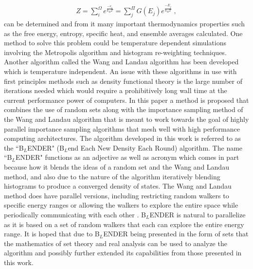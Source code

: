 \documentclass[aps,prl,reprint,superscriptaddress,showkeys]{revtex4-1}
\begin{document}
\begin{equation}
\begin{split}
Z = \sum_{i}^{\Omega}e^{\frac{-e_i}{k_B T} }= \sum_{j}^{\Pi}G(E_j)e^{\frac{-E_j}{k_BT}} \;,
\end{split}
\end{equation}
can be  determined and from it many important thermodynamics properties such as the free energy, entropy, specific heat, and ensemble averages calculated. One method to solve this problem could be temperature dependent simulations involving the  Metropolis algorithm and histogram re-weighting techniques\cite{metropolis_equation_1953, landau_MC_simulations}.  Another algorithm called the  Wang and Landau algorithm\cite{WL_phys_rev_lett} has been developed which is temperature independent. An issue with these algorithms in use with first principles methods such as density functional theory is the large number of iterations needed which would require a prohibitively long wall time at the current performance power of computers.  In this paper a method is proposed that combines the use of random sets along with the importance sampling method of the Wang and Landau algorithm that is meant to work towards the goal of highly parallel importance sampling algorithms that mesh well with high performance computing architectures. The algorithm developed in this work is referred to as the ``B$_{L}$ENDER" (B$_{L}$end Each New Density Each Round) algorithm. The name ``B$_{L}$ENDER" functions as an  adjective as well as acronym which comes in part because how it blends the ideas of a random set and the Wang and Landau method, and also due to the nature of the algorithm iteratively blending histograms to produce a converged density of states.  The Wang and Landau method does have parallel versions, including  restricting random walkers to specific energy ranges or allowing the walkers to explore the entire space while periodically communicating with each other \cite{MP_Wang_Landau,P_imp_Wang_Landau, Hframe_Wang_Landau}.  B$_{L}$ENDER is natural to parallelize as it is based on a set of random walkers that each can explore the entire energy range. It is hoped that due to B$_{L}$ENDER being presented in the form of sets that the mathematics of set theory and real analysis can be used to analyze the algorithm and possibly further extended its capabilities from those presented in this work. 
\end{document}
